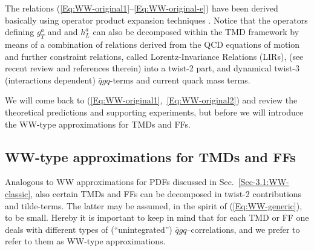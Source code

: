 \documentclass[a4paper,11pt]{article}
\newcommand{\darkgreen}[1]{{\color{darkgreen} #1}}
\newcommand{\ms}[1]{\darkgreen{ #1}}
\begin{document}
\ms{The relations (\ref{Eq:WW-original1}--\ref{Eq:WW-original-e})
have been derived basically using operator product expansion
techniques \cite{Wandzura:1977qf,Jaffe:1991ra}. Notice that the 
operators defining $g_T^a$ and and $h_L^a$ can also be decomposed 
within the TMD framework by means of a combination of relations 
derived from the QCD equations of motion and further 
constraint relations, called Lorentz-Invariance Relations (LIRs), 
(see recent review \cite{Kanazawa:2015ajw} and references therein) 
into a twist-2 part, and dynamical twist-3 (interactions dependent) 
$\bar{q}gq$-terms and current quark mass terms.}

We will come back to (\ref{Eq:WW-original1},~\ref{Eq:WW-original2}) and 
review the theoretical predictions and supporting experiments, but before
we will introduce the WW-type approximations for TMDs and FFs.

\subsection{WW-type approximations for TMDs and FFs}
\label{Sec-3.2:WW-type-TMD-FF}

Analogous to WW approximations for PDFs discussed in 
Sec.~\ref{Sec-3.1:WW-classic}, also certain TMDs and FFs
can be decomposed in twist-2 contributions and tilde-terms.
The latter may be assumed, in the spirit of (\ref{Eq:WW-generic}),
to be small. Hereby it is important to keep in mind that for each TMD
or FF one deals 
with different types of (``unintegrated'') $\bar{q}gq$--correlations,
and we prefer to refer to them as WW-type approximations.
\end{document}
